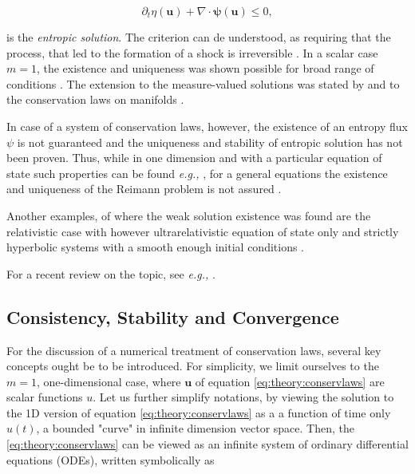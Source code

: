 \documentclass[11pt,a4paper,headinclude=true,DIV=14,BCOR=8mm,chapterprefix,listof=totoc,twoside,openright,abstracton]{scrbook}
\begin{document}
\begin{equation}
\partial_t\eta(\boldsymbol{u}) + \nabla\cdot\boldsymbol{\psi}(\boldsymbol{u})\leq 0,
\label{eq:theory:nummeth:entropic}
\end{equation}

is the \textit{entropic solution}. The criterion can de understood, as requiring that the process, that led to the formation of a shock is irreversible \cite{LeVeque:1992}. In a scalar case $m=1$, the existence and uniqueness was shown possible for broad range of conditions \cite{Kruzkov:1970}. The extension to the  measure-valued solutions was stated by \cite{DiPerna:1985} and to the conservation laws on manifolds \cite{Benartzi:2007}. 

In case of a system of conservation laws, however, the existence of an entropy flux $\psi$ is not guaranteed and the uniqueness and stability of entropic solution has not been proven. 
Thus, while in one dimension and with a particular equation of state such properties can be found \textit{e.g.,} \cite{Chen:2009}, for a general equations the existence and uniqueness of the Reimann problem is not assured \cite{Curtis:1972}.

Another examples, of where the weak solution existence was found are the relativistic case \cite{Glimm:1965} with however ultrarelativistic equation of state only \cite{Smoller:1993} and strictly hyperbolic systems with a smooth enough initial conditions \cite{Lax:1957}.

For a recent review on the topic, see \textit{e.g.,} \cite{Chen:2006}. 


\subsection{Consistency, Stability and Convergence}

For the discussion of a numerical treatment of conservation laws, several key concepts ought be to be introduced. For simplicity, we limit ourselves to the $m=1$, one-dimensional case, where $\boldsymbol{u}$ of equation \ref{eq:theory:conservlaws} are scalar functions $u$. Let us further simplify notations, by viewing the solution to the 1D version of equation \ref{eq:theory:conservlaws} as a a function of time only $u(t)$, a bounded "curve" in infinite dimension vector space. Then, the \ref{eq:theory:conservlaws} can be viewed as an infinite system of ordinary differential equations (ODEs), written symbolically as
\end{document}
